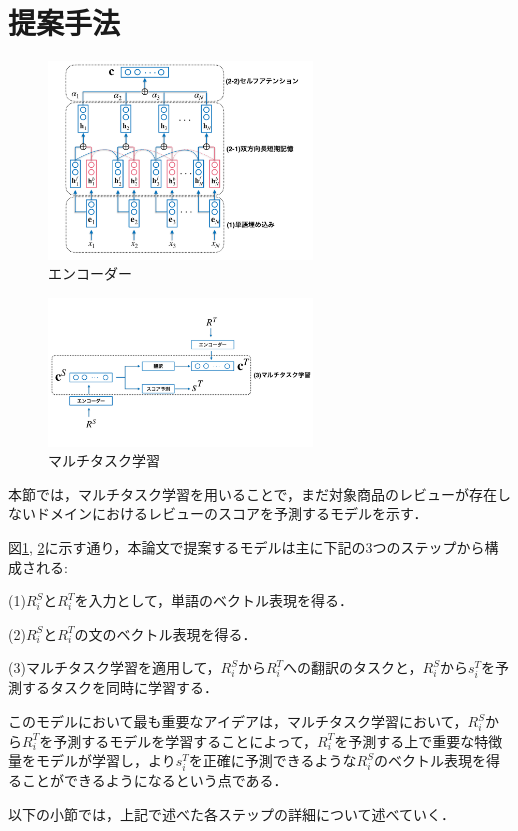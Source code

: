 \documentclass[dvipdfmx,twocolumn,10.5pt]{jsarticle}
\begin{document}
\section{提案手法}\label{suggestion}
\begin{figure}[tb]
	\centering
	\includegraphics[width=7cm]{images/encoder2.pdf} 
	\caption{エンコーダー}
	\label{encoder}
\end{figure}
\begin{figure}[tb]
	\centering
	\includegraphics[width=7cm]{images/multitaskLearning.pdf} 
	\caption{マルチタスク学習}
	\label{multitaskLearning}
\end{figure}
本節では，マルチタスク学習を用いることで，まだ対象商品のレビューが存在しないドメインにおけるレビューのスコアを予測するモデルを示す．

図\ref{encoder}, \ref{multitaskLearning}に示す通り，本論文で提案するモデルは主に下記の3つのステップから構成される:

(1)$R^S_i$と$R^T_i$を入力として，単語のベクトル表現を得る．

(2)$R^S_i$と$R^T_i$の文のベクトル表現を得る．

(3)マルチタスク学習を適用して，$R^S_i$から$R^T_i$への翻訳のタスクと，$R^S_i$から$s_i^T$を予測するタスクを同時に学習する．

このモデルにおいて最も重要なアイデアは，マルチタスク学習において，$R^S_i$から$R^T_i$を予測するモデルを学習することによって，$R_i^T$を予測する上で重要な特徴量をモデルが学習し，より$s_i^T$を正確に予測できるような$R_i^S$のベクトル表現を得ることができるようになるという点である．

以下の小節では，上記で述べた各ステップの詳細について述べていく．
\end{document}
